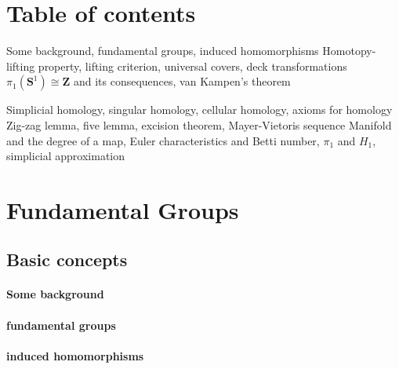 \documentclass[11pt]{article}
\theoremstyle{definition}
\theoremstyle{plain}
\newcommand{\Z}{\mathbf{Z}}
\newcommand{\s}{\mathbf{S}}
\newcommand{\forceindent}{\leavevmode{\parindent=1.5em\indent}}
\begin{document}
\section*{Table of contents}

\forceindent\forceindent\forceindent Some background, fundamental groups, induced homomorphisms
\forceindent\forceindent\forceindent Homotopy-lifting property, lifting criterion, universal covers, deck transformations
\forceindent\forceindent\forceindent $\pi_1(\s^1)\cong\Z$ and its consequences, van Kampen's theorem

\forceindent\forceindent\forceindent Simplicial homology, singular homology, cellular homology, axioms for homology
\forceindent\forceindent\forceindent Zig-zag lemma, five lemma, excision theorem, Mayer-Vietoris sequence
\forceindent\forceindent\forceindent Manifold and the degree of a map, Euler characteristics and Betti number, $\pi_1$ and $H_1$,\newline
\forceindent\forceindent\forceindent simplicial approximation


\newpage
\section{Fundamental Groups}

\subsection{Basic concepts}

\paragraph{Some background}

\paragraph{fundamental groups}

\paragraph{induced homomorphisms}
\end{document}
